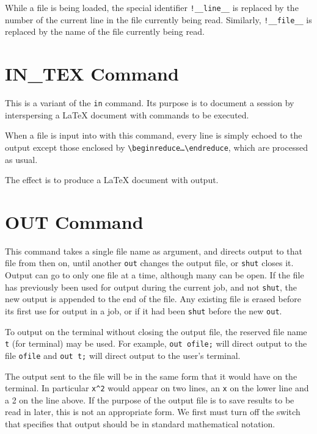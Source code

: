 While a file is being loaded, the special identifier
\texttt{!\_\_line\_\_}
is replaced by the number of the current line in the file currently
being read.
Similarly, \texttt{!\_\_file\_\_}
is replaced by the name of the file currently
being read.

\section{IN\_TEX Command}
\hypertarget{command:IN_TEX}{}

This is a variant of the \texttt{in} command. Its purpose is to document a \REDUCE session
by interspersing a \LaTeX{} document with \REDUCE commands to be executed.

When a file is input into \REDUCE with this command, every line is simply echoed to the output
except those enclosed by
\texttt{\textbackslash begin\textbraceleft reduce\textbraceright\ldots\textbackslash end\textbraceleft reduce\textbraceright},
which are processed as usual.

The effect is to produce a \LaTeX{} document with \REDUCE output.


\section{OUT Command}
\hypertarget{command:OUT}{}
This command takes a single file name as argument, and directs output to
that file from then on, until another \texttt{out} changes the output file,
or \texttt{shut} closes it.  Output can go to only one file at a time,
although many can be open.  If the file has previously been used for
output during the current job, and not \texttt{shut}, the new
output is appended to the end of the file.  Any existing file is erased
before its first use for output in a job, or if it had been \texttt{shut}
before the new \texttt{out}.

To output on the terminal without closing the output file, the reserved
file name \texttt{t} (for terminal) may be used.  For example,
\texttt{out ofile;} will direct output to the file \texttt{ofile} and
\texttt{out t;} will direct output to the user's terminal.

The output sent to the file will be in the same form that it would have on
the terminal.  In particular \texttt{x\textasciicircum 2} would appear
on two lines, an
\texttt{x} on the lower line and a 2 on the line above.  If the purpose of the
output file is to save results to be read in later, this is not an
appropriate form.  We first must turn off the  switch that
specifies that output should be in standard mathematical notation.

